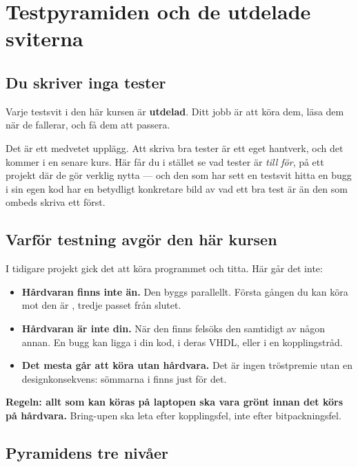 \section{Testpyramiden och de utdelade sviterna}
\label{sec:pyramid}

\subsection{Du skriver inga tester}

Varje testsvit i den här kursen är \textbf{utdelad}. Ditt jobb är att köra dem, läsa dem när de
fallerar, och få dem att passera.

Det är ett medvetet upplägg. Att skriva bra tester är ett eget hantverk, och det kommer i en senare
kurs. Här får du i stället se vad tester är \emph{till för}, på ett projekt där de gör verklig
nytta --- och den som har sett en testsvit hitta en bugg i sin egen kod har en betydligt
konkretare bild av vad ett bra test är än den som ombeds skriva ett först.

\subsection{Varför testning avgör den här kursen}

I tidigare projekt gick det att köra programmet och titta. Här går det inte:

\begin{itemize}
  \item \textbf{Hårdvaran finns inte än.} Den byggs parallellt. Första gången du kan köra mot den
    är , tredje passet från slutet.
  \item \textbf{Hårdvaran är inte din.} När den finns felsöks den samtidigt av någon annan. En
    bugg kan ligga i din kod, i deras VHDL, eller i en kopplingstråd.
  \item \textbf{Det mesta går att köra utan hårdvara.} Det är ingen tröstpremie utan en
    designkonsekvens: sömmarna i  finns just för det.
\end{itemize}

\textbf{Regeln: allt som kan köras på laptopen ska vara grönt innan det körs på hårdvara.}
Bring-upen ska leta efter kopplingsfel, inte efter bitpackningsfel.

\subsection{Pyramidens tre nivåer}

